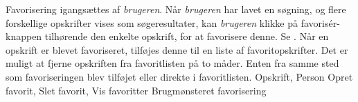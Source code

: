 {Favorisering igangsættes af \textit{brugeren}. Når \textit{brugeren} har lavet en søgning, og flere forskellige opskrifter vises som søgeresultater, kan \textit{brugeren} klikke på favorisér-knappen tilhørende den enkelte opskrift, for at favorisere denne. Se . Når en opskrift er blevet favoriseret, tilføjes denne til en liste af favoritopskrifter. Det er muligt at fjerne opskriften fra favoritlisten på to måder. Enten fra samme sted som favoriseringen blev tilføjet eller direkte i favoritlisten.}
{Opskrift, Person}
{Opret favorit, Slet favorit, Vis favoritter}
{Brugmønsteret favorisering}
